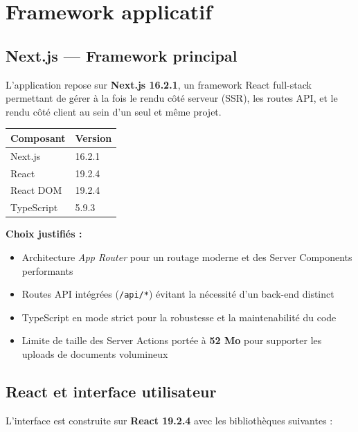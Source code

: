 \documentclass[a4paper,12pt,french]{article}
\begin{document}

\section{Framework applicatif}

\subsection{Next.js — Framework principal}

L'application repose sur \textbf{Next.js 16.2.1}, un framework React full-stack permettant de gérer à la fois le rendu côté serveur (SSR), les routes API, et le rendu côté client au sein d'un seul et même projet.

\begin{tabularx}{\textwidth}{l X}
\toprule
\textbf{Composant} & \textbf{Version} \\
\midrule
Next.js & 16.2.1 \\
React & 19.2.4 \\
React DOM & 19.2.4 \\
TypeScript & 5.9.3 \\
\bottomrule
\end{tabularx}

\vspace{0.5em}

\textbf{Choix justifiés :}
\begin{itemize}
  \item Architecture \textit{App Router} pour un routage moderne et des Server Components performants
  \item Routes API intégrées (\texttt{/api/*}) évitant la nécessité d'un back-end distinct
  \item TypeScript en mode strict pour la robustesse et la maintenabilité du code
  \item Limite de taille des Server Actions portée à \textbf{52 Mo} pour supporter les uploads de documents volumineux
\end{itemize}

\subsection{React et interface utilisateur}

L'interface est construite sur \textbf{React 19.2.4} avec les bibliothèques suivantes :
\end{document}
